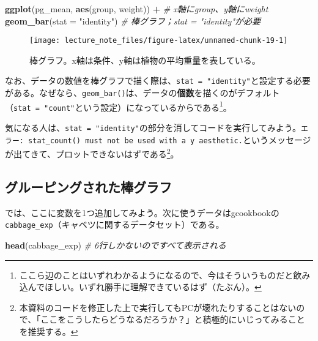 \documentclass[]{book}
\newenvironment{Shaded}{\begin{snugshade}}{\end{snugshade}}
\newcommand{\KeywordTok}[1]{\textcolor[rgb]{0.13,0.29,0.53}{\textbf{#1}}}
\newcommand{\DataTypeTok}[1]{\textcolor[rgb]{0.13,0.29,0.53}{#1}}
\newcommand{\StringTok}[1]{\textcolor[rgb]{0.31,0.60,0.02}{#1}}
\newcommand{\CommentTok}[1]{\textcolor[rgb]{0.56,0.35,0.01}{\textit{#1}}}
\newcommand{\OperatorTok}[1]{\textcolor[rgb]{0.81,0.36,0.00}{\textbf{#1}}}
\newcommand{\NormalTok}[1]{#1}
\let\rmarkdownfootnote\footnote%
\def\footnote{\protect\rmarkdownfootnote}
\begin{document}
\begin{Shaded}
\begin{Highlighting}[]
\KeywordTok{ggplot}\NormalTok{(pg_mean, }\KeywordTok{aes}\NormalTok{(group, weight)) }\OperatorTok{+}\StringTok{ }\CommentTok{# x軸にgroup、y軸にweight}
\StringTok{  }\KeywordTok{geom_bar}\NormalTok{(}\DataTypeTok{stat =} \StringTok{"identity"}\NormalTok{) }\CommentTok{# 棒グラフ；stat = "identity"が必要}
\end{Highlighting}
\end{Shaded}

\begin{figure}

{\centering \texttt{[image: lecture\_note\_files/figure-latex/unnamed-chunk-19-1]} 

}

\caption{棒グラフ。x軸は条件、y軸は植物の平均重量を表している。}\label{fig:unnamed-chunk-19}
\end{figure}

なお、データの数値を棒グラフで描く際は、\texttt{stat\ =\ "identity"}と設定する必要がある。なぜなら、\texttt{geom\_bar()}は、データの\textbf{個数}を描くのがデフォルト（\texttt{stat\ =\ "count"}という設定）になっているからである\footnote{ここら辺のことはいずれわかるようになるので、今はそういうものだと飲み込んでほしい。いずれ勝手に理解できているはず（たぶん）。}。

気になる人は、\texttt{stat\ =\ "identity"}の部分を消してコードを実行してみよう。\texttt{エラー:\ stat\_count()\ must\ not\ be\ used\ with\ a\ y\ aesthetic.}というメッセージが出てきて、プロットできないはずである\footnote{本資料のコードを修正した上で実行してもPCが壊れたりすることはないので、「ここをこうしたらどうなるだろうか？」と積極的にいじってみることを推奨する。}。

\subsection{グルーピングされた棒グラフ}

では、ここに変数を1つ追加してみよう。次に使うデータはgcookbookの\texttt{cabbage\_exp}（キャベツに関するデータセット）である。

\begin{Shaded}
\begin{Highlighting}[]
\KeywordTok{head}\NormalTok{(cabbage_exp) }\CommentTok{# 6行しかないのですべて表示される}
\end{Highlighting}
\end{Shaded}
\end{document}
